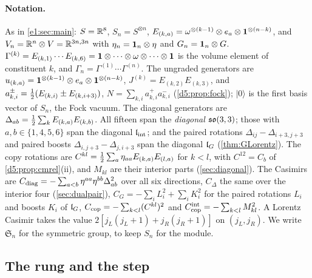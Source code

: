 \paragraph{Notation.} As in \cref{e1:sec:main}: $S=\mathbb{R}^8$, $S_n=S^{\otimes n}$, $E_{(k,a)}=\omega^{\otimes(k-1)}\otimes e_a\otimes\mathbf 1^{\otimes(n-k)}$, and
$V_n=\mathbb{R}^n\otimes V=\mathbb{R}^{3n,3n}$ with $\eta_n=\mathbf 1_n\otimes\eta$ and $G_n=\mathbf 1_n\otimes G$. $\Gamma^{(k)}=E_{(k,1)}\cdots E_{(k,6)}=\mathbf 1\otimes\cdots\otimes\omega\otimes\cdots\otimes\mathbf 1$ is the
volume element of constituent $k$, and $\Gamma_n=\Gamma^{(1)}\cdots\Gamma^{(n)}$. The ungraded generators are
$u_{(k,a)}=\mathbf 1^{\otimes(k-1)}\otimes e_a\otimes\mathbf 1^{\otimes(n-k)}$, $J^{(k)}=E_{(k,2)}E_{(k,3)}$, and $a^\pm_{k,i}=\tfrac12(E_{(k,i)}\pm E_{(k,i+3)})$, $N=\sum_{k,i}a^+_{k,i}a^-_{k,i}$
(\cref{d5:prop:fock}); $|0\rangle$ is the first basis vector of $S_n$, the Fock vacuum. The diagonal generators are
$\Delta_{ab}=\tfrac12\sum_kE_{(k,a)}E_{(k,b)}$. All fifteen span the \emph{diagonal} $\mathfrak{so}(3,3)$; those with $a,b\in\{1,4,5,6\}$ span the diagonal $\mathfrak l_{\rm int}$; and the
paired rotations $\Delta_{ij}-\Delta_{i+3,j+3}$ and paired boosts $\Delta_{i,j+3}-\Delta_{j,i+3}$ span the diagonal $\mathfrak l_G$ (\cref{thm:GLorentz}). The
copy rotations are $C^{kl}=\tfrac12\sum_a\eta_{aa}E_{(k,a)}E_{(l,a)}$ for $k<l$, with $C^{12}=C_b$ of \cref{d5:prop:cmrel}(ii), and $M_{kl}$ are their
interior parts (\cref{sec:diagonal}). The Casimirs are $C_{\rm diag}=-\sum_{a<b}\eta^{aa}\eta^{bb}\Delta_{ab}^2$ over all six directions,
$C_\Delta$ the same over the interior four (\cref{sec:dualpair}), $C_G=-\sum_iL_i^2+\sum_iK_i^2$ for the paired rotations $L_i$ and boosts
$K_i$ of $\mathfrak l_G$, $C_{\rm cop}=-\sum_{k<l}(C^{kl})^2$ and $C^{\rm int}_{\rm cop}=-\sum_{k<l}M_{kl}^2$. A Lorentz Casimir takes the value
$2[j_L(j_L+1)+j_R(j_R+1)]$ on $(j_L,j_R)$. We write $\mathfrak S_n$ for the symmetric group, to keep $S_n$ for the module.

\subsection{The rung and the step}
\label{e3:sec:rung}

